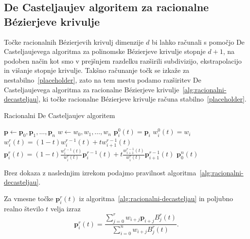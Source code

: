 \documentclass[isrm2, tisk]{fmfdelo}
\newcommand{\p}{\mathbf{p}}
\begin{document}
    \subsection{De Casteljaujev algoritem za racionalne Bézierjeve krivulje}
    Točke racionalnih Bézierjevih krivulj dimenzije $d$ bi lahko računali s pomočjo De Casteljaujevega algoritma za polinomske Bézierjeve krivulje stopnje $d+1$, na podoben način kot smo v prejšnjem razdelku razširili subdivizijo, ekstrapolacijo in višanje stopnje krivulje.
    Takšno računanje točk se izkaže za nestabilno~\ref{placeholder}, zato na tem mestu podamo razširitev De Casteljaujevega algoritma za racionalne Bézierjeve krivulje~\ref{alg:racionalni-decasteljau}, ki točke racionalne Bézierjeve krivulje računa stabilno~\ref{placeholder}.
    \begin{algorithm}[h!]
        \caption{Racionalni De Casteljaujev algoritem}
        \begin{algorithmic}
            \State $\p \gets \p_0,\p_1,\dots,\p_n$
            \State $w\gets w_0,w_1,\dots,w_n$
                \State $\p_i^0(t)=\p_i$
                \State $w_i^0(t)=w_i$
            \EndFor
                    \State $w_i^r(t)=(1-t)w_{i}^{r-1}(t)+tw_{i+1}^{r-1}(t)$
                    \State $\p_i^r(t)=(1-t)\frac{w_{i}^{r-1}(t)}{w_{i}^{r}(t)}\p_i^{r-1}(t)+t\frac{w_{i+1}^{r-1}(t)}{w_{i}^{r}(t)}\p_{i+1}^{r-1}(t)$
                \EndFor
            \EndFor
            \State \Return $\p_0^n(t)$
        \end{algorithmic}\label{alg:racionalni-decasteljau}
    \end{algorithm}

    \noindent Brez dokaza z naslednjim izrekom podajmo pravilnost algoritma~\ref{alg:racionalni-decasteljau}.
    \begin{izrek}
        Za vmesne točke $\p_i^r(t)$ iz algoritma~\ref{alg:racionalni-decasteljau} in poljubno realno število $t$ velja izraz
        \[\p_i^r(t)= \frac{\sum^{r}_{j=0}w_{i+j}\p_{i+j} B^r_j(t)}{\sum^{n}_{i=0}w_{i+j} B^r_j(t)}. \]
    \end{izrek}
\end{document}
